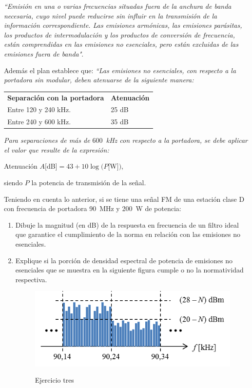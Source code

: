 \begin{enumerate}
\textit{``Emisión en una o varias frecuencias situadas fuera de la anchura de banda necesaria, cuyo nivel puede reducirse sin influir en la transmisión de la información correspondiente. Las emisiones armónicas, las emisiones parásitas, los productos de intermodulación y los productos de conversión de frecuencia, están comprendidas en las emisiones no esenciales, pero están excluidas de las emisiones fuera de banda"}.

Además el plan establece que: 
\textit{``Las emisiones no esenciales, con respecto a la portadora sin modular, deben atenuarse de la siguiente manera:}

\begin{tabular}{ll}
	\textbf{Separación con la portadora} & \textbf{Atenuación} \\
	Entre 120 y 240 kHz. & 25 dB \\
	Entre 240 y 600 kHz. & 35 dB
\end{tabular}

\textit{Para separaciones de más de $600$~kHz con respecto a la portadora, se debe aplicar el valor que resulte de la expresión:}
\begin{center}
	Atenuación $A[$dB$] = 43 + 10 \log (P[$W$])$,
\end{center}
siendo $P$ la potencia de transmisión de la señal.

Teniendo en cuenta lo anterior, si se tiene una señal FM de una estación clase D con frecuencia de portadora 90~MHz y 200~W de potencia:

\begin{enumerate}
	\item Dibuje la magnitud (en dB) de la respuesta en frecuencia de un filtro ideal que garantice el cumplimiento de la norma en relación con las emisiones no esenciales.
	
	\item Explique si la porción de densidad espectral de potencia de emisiones no esenciales que se muestra en la siguiente figura cumple o no la normatividad respectiva.

\vspace{100px}
\begin{figure}[h!]
	\captionsetup{justification = raggedright, singlelinecheck = false}
	\caption{Ejercicio tres} 
	\centering
	\includegraphics[scale=1]{Imagenes/fig01.png}
	\label{fig:fig01}
\end{figure}


\end{enumerate}
\end{enumerate}
